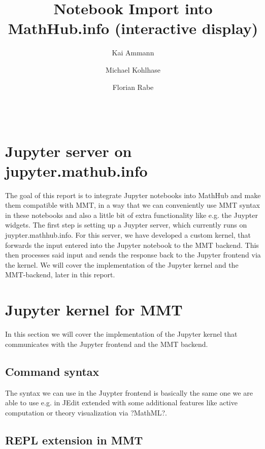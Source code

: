 \documentclass[book]{deliverablereport}
\title{Notebook Import into MathHub.info (interactive display)}
\author{Kai Ammann}
\author{Michael Kohlhase}
\author{Florian Rabe}
\begin{document}
\begin{abstract}\strut\\
\end{abstract}
\maketitle
\newpage\tableofcontents\newpage

\section{Jupyter server on jupyter.mathub.info}
The goal of this report is to integrate Jupyter notebooks into MathHub
and make them compatible with MMT, in a way that we can conveniently use 
MMT syntax in these notebooks and also a little bit of extra functionality
like e.g. the Juypter widgets. The first step is setting up a Juypter server,
which currently runs on juypter.mathhub.info. %
For this server, we have developed a custom kernel, that forwards the input 
entered into the Jupyter notebook to the MMT backend. This then processes 
said input and sends the response back to the Jupyter frontend via the kernel.
We will cover the implementation of the Jupyter kernel and the MMT-backend,
later in this report.

\section{Jupyter kernel for MMT} %
In this section we will cover the implementation of the Jupyter kernel that
communicates with the Jupyter frontend and the MMT backend. 
\subsection{Command syntax}
The syntax we can use in the Juypter frontend is basically the same one we are able to 
use e.g. in JEdit extended with some additional features like active computation
or theory visualization via ?MathML?. 
\subsection{REPL extension in MMT}
% 
\end{document}
